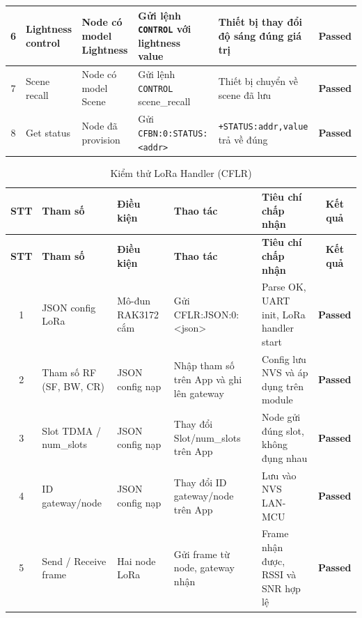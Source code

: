 \begin{longtable}{|c|p{2cm}|p{2cm}|p{4cm}|p{4cm}|c|}
            6 & Lightness control & Node có model Lightness & Gửi lệnh \texttt{CONTROL} với lightness value & Thiết bị thay đổi độ sáng đúng giá trị & \textcolor{modern_blue}{\textbf{Passed}} \\ \hline
        
            7 & Scene recall & Node có model Scene & Gửi lệnh \texttt{CONTROL} scene\_recall & Thiết bị chuyển về scene đã lưu & \textcolor{modern_blue}{\textbf{Passed}} \\ \hline
        
            8 & Get status & Node đã provision & Gửi \texttt{CFBN:0:}\newline\texttt{STATUS:<addr>} & \texttt{+STATUS:addr,}\newline\texttt{value} trả về đúng & \textcolor{modern_blue}{\textbf{Passed}} \\ \hline
        \end{longtable}

        \begin{longtable}{|c|p{2cm}|p{2.5cm}|p{3.5cm}|p{4cm}|c|}
            \caption{Kiểm thử LoRa Handler (CFLR)}
            \label{tab:test_lora_handler} \\
            \hline
            \textbf{STT} & \textbf{Tham số} & \textbf{Điều kiện} & \textbf{Thao tác} & \textbf{Tiêu chí chấp nhận} & \textbf{Kết quả} \\ \hline
            \endfirsthead
            \hline
            \textbf{STT} & \textbf{Tham số} & \textbf{Điều kiện} & \textbf{Thao tác} & \textbf{Tiêu chí chấp nhận} & \textbf{Kết quả} \\ \hline
            \endhead
            \hline
            \endfoot
            \endlastfoot
        
            1 & JSON config LoRa & Mô-đun RAK3172 cắm & Gửi CFLR:JSON:0:\newline<json> & Parse OK, UART init, LoRa handler start & \textcolor{modern_blue}{\textbf{Passed}} \\ \hline
            2 & Tham số RF (SF, BW, CR) & JSON config nạp & Nhập tham số trên App và ghi lên gateway & Config lưu NVS và áp dụng trên module & \textcolor{modern_blue}{\textbf{Passed}} \\ \hline
            3 & Slot TDMA / num\_slots & JSON config nạp & Thay đổi Slot/num\_slots trên App & Node gửi đúng slot, không đụng nhau & \textcolor{modern_blue}{\textbf{Passed}} \\ \hline
            4 & ID gateway/node & JSON config nạp & Thay đổi ID gateway/node trên App & Lưu vào NVS LAN-MCU & \textcolor{modern_blue}{\textbf{Passed}} \\ \hline
            5 & Send / Receive frame & Hai node LoRa & Gửi frame từ node, gateway nhận & Frame nhận được, RSSI và SNR hợp lệ & \textcolor{modern_blue}{\textbf{Passed}} \\ \hline
        \end{longtable}
        
